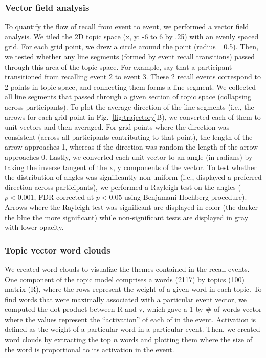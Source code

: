 \documentclass{article}
\begin{document}
\subsubsection*{Vector field analysis}
To quantify the flow of recall from event to event, we performed a vector field analysis.  We tiled the 2D topic space (x, y: -6 to 6 by .25) with an evenly spaced grid. For each grid point, we drew a circle around the point (radius= 0.5). Then, we tested whether any line segments (formed by event recall transitions) passed through this area of the topic space.  For example, say that a participant transitioned from recalling event 2 to event 3. These 2 recall events correspond to 2 points in topic space, and connecting them forms a line segment. We collected all line segments that passed through a given section of topic space (collapsing across participants). To plot the average direction of the line segments (i.e., the arrows for each grid point in Fig.~\ref{fig:trajectory}B), we converted each of them to unit vectors and then averaged. For grid points where the direction was consistent (across all participants contributing to that point), the length of the arrow approaches 1, whereas if the direction was random the length of the arrow approaches 0. Lastly, we converted each unit vector to an angle (in radians) by taking the inverse tangent of the x, y components of the vector. To test whether the distribution of angles was significantly non-uniform (i.e., displayed a preferred direction across participants), we performed a Rayleigh test on the angles ($p < 0.001$, FDR-corrected at $p < 0.05$ using Benjamani-Hochberg procedure). Arrows where the Rayleigh test was significant are displayed in color (the darker the blue the more significant) while non-significant tests are displayed in gray with lower opacity.

\subsubsection*{Topic vector word clouds}
We created word clouds to visualize the themes contained in the recall events. One component of the topic model comprises a words (2117) by topics (100) matrix (R), where the rows represent the weight of a given word in each topic.  To find words that were maximally associated with a particular event vector, we computed the dot product between R and v, which gave a 1 by \# of words vector where the values represent the ``activation'' of each of in the event. Activation is defined as the weight of a particular word in a particular event. Then, we created word clouds by extracting the top $n$ words and plotting them where the size of the word is proportional to its activation in the event.
\end{document}
